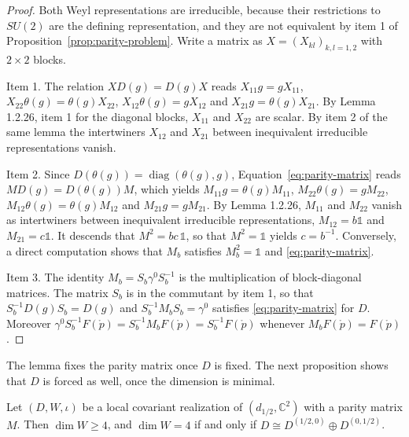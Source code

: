 \begin{proof}
	Both Weyl representations are irreducible, because their restrictions to $SU(2)$ are the defining representation, and they are not equivalent by item 1 of Proposition~\ref{prop:parity-problem}. Write a matrix as $X=(X_{kl})_{k,l=1,2}$ with $2\times2$ blocks.
	
	Item 1. The relation $XD(g)=D(g)X$ reads $X_{11}g=gX_{11}$, $X_{22}\theta(g)=\theta(g)X_{22}$, $X_{12}\theta(g)=gX_{12}$ and $X_{21}g=\theta(g)X_{21}$. By Lemma 1.2.26, item 1 for the diagonal blocks, $X_{11}$ and $X_{22}$ are scalar. By item 2 of the same lemma the intertwiners $X_{12}$ and $X_{21}$ between inequivalent irreducible representations vanish.
	
	Item 2. Since $D(\theta(g))=\operatorname{diag}(\theta(g),g)$, Equation~\eqref{eq:parity-matrix} reads $MD(g)=D(\theta(g))M$, which yields $M_{11}g=\theta(g)M_{11}$, $M_{22}\theta(g)=gM_{22}$, $M_{12}\theta(g)=\theta(g)M_{12}$ and $M_{21}g=gM_{21}$. By Lemma 1.2.26, $M_{11}$ and $M_{22}$ vanish as intertwiners between inequivalent irreducible representations, $M_{12}=b\mathbb{1}$ and $M_{21}=c\mathbb{1}$. It descends that $M^2=bc\,\mathbb{1}$, so that $M^2=\mathbb{1}$ yields $c=b^{-1}$. Conversely, a direct computation shows that $M_b$ satisfies $M_b^2=\mathbb{1}$ and \eqref{eq:parity-matrix}.
	
	Item 3. The identity $M_b=S_b\gamma^0S_b^{-1}$ is the multiplication of block-diagonal matrices. The matrix $S_b$ is in the commutant by item 1, so that $S_b^{-1}D(g)S_b=D(g)$ and $S_b^{-1}M_bS_b=\gamma^0$ satisfies \eqref{eq:parity-matrix} for $D$. Moreover $\gamma^0S_b^{-1}F(\mathring{p})=S_b^{-1}M_bF(\mathring{p})=S_b^{-1}F(\mathring{p})$ whenever $M_bF(\mathring{p})=F(\mathring{p})$.
\end{proof}

\noindent The lemma fixes the parity matrix once $D$ is fixed. The next proposition shows that $D$ is forced as well, once the dimension is minimal.

\begin{proposition}\label{prop:minimal-extension}
	Let $(D,W,\iota)$ be a local covariant realization of $(d_{1/2},\mathbb{C}^2)$ with a parity matrix $M$. Then $\dim W\geq4$, and $\dim W=4$ if and only if $D\cong D^{(1/2,0)}\oplus D^{(0,1/2)}$.
\end{proposition}


